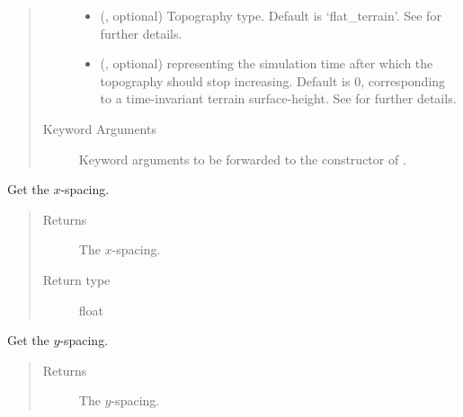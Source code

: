 \documentclass[letterpaper,10pt,english]{sphinxmanual}
\begin{document}
\begin{fulllineitems}
\begin{fulllineitems}
\begin{quote}
\begin{description}
\begin{itemize}
\item {} 
 (, optional) \textendash{} Topography type. Default is ‘flat\_terrain’. See {\hyperref[\detokenize{api:module-tasmania.grids.topography}]{}} for further details.

\item {} 
 (, optional) \textendash{}  representing the simulation time after which the topography should stop
increasing. Default is 0, corresponding to a time-invariant terrain surface-height. See
{\hyperref[\detokenize{api:module-tasmania.grids.topography}]{}} for further details.

\end{itemize}

\item[{Keyword Arguments}] \leavevmode
{} \textendash{} Keyword arguments to be forwarded to the constructor of {\hyperref[\detokenize{api:tasmania.grids.topography.Topography2d}]{}}.

\end{description}\end{quote}

\end{fulllineitems}


\begin{fulllineitems}
\label{\detokenize{api:tasmania.grids.grid_xyz.GridXYZ.dx}}
Get the \(x\)-spacing.
\begin{quote}\begin{description}
\item[{Returns}] \leavevmode
The \(x\)-spacing.

\item[{Return type}] \leavevmode
float

\end{description}\end{quote}

\end{fulllineitems}


\begin{fulllineitems}
\label{\detokenize{api:tasmania.grids.grid_xyz.GridXYZ.dy}}
Get the \(y\)-spacing.
\begin{quote}\begin{description}
\item[{Returns}] \leavevmode
The \(y\)-spacing.


\end{description}
\end{quote}
\end{fulllineitems}
\end{fulllineitems}
\end{document}
